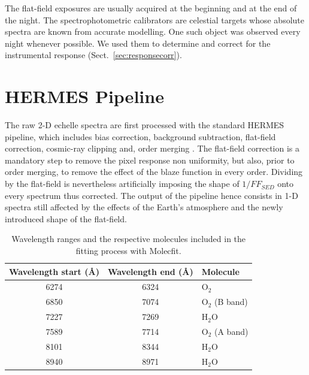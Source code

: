 The flat-field exposures are usually acquired at the beginning and at the end of the night. The spectrophotometric calibrators are celestial targets whose absolute spectra are known from accurate modelling. One such object was observed every night whenever possible. We used them to determine and correct for the instrumental response (Sect.~\ref{sec:responsecorr}).

\section{HERMES Pipeline}
The raw 2-D echelle spectra are first processed with the standard HERMES pipeline, which includes bias correction, background subtraction, flat-field correction, cosmic-ray clipping and, order merging \citep{raskin_hermes_2011}. The flat-field correction is a mandatory step to remove the pixel response non
uniformity, but also, prior to order merging, to remove the effect of the blaze function in every order. Dividing by the flat-field is nevertheless artificially imposing the shape of $1 / FF_{SED}$ onto every spectrum thus corrected. The output of the pipeline hence consists in 1-D spectra still affected by the effects of the Earth's atmosphere and the newly introduced shape of the flat-field.


\begin{table}[ht]
\centering
\caption{Wavelength ranges and the respective molecules included in the fitting process with Molecfit.}
\begin{tabular}{ccl}
\hline \hline
Wavelength start (\AA) & Wavelength end (\AA) & Molecule \\
\hline
6274 & 6324 & O$_2$     \\
6850 & 7074 & O$_2$ (B band)     \\
7227 & 7269 & H$_2$O    \\
7589 & 7714 & O$_2$ (A band)    \\
8101 & 8344 & H$_2$O    \\
8940 & 8971 & H$_2$O    \\
\hline
\end{tabular}
\label{tab:molecfitranges}
\end{table}

